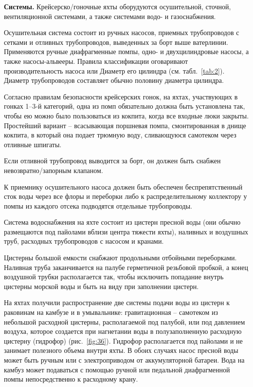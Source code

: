 \documentclass[a4paper, 12pt, twoside, final, book, russian, fittopage, cyremdash]{ncc}
\newcommand{\ris}[1]{\ref{fig:#1}}
\begin{document}
\textbf{Системы.} Крейсерско\-/гоночные яхты оборудуются осушительной, сточной, вентиляционной системами, а также системами водо- и газоснабжения. 

Осушительная система состоит из ручных насосов, приемных трубопроводов с сетками и отливных трубопроводов, выведенных за борт выше ватерлинии. Применяются ручные диафрагменные помпы, одно- и двухцилиндровые насосы, а также насосы-альвееры. Правила классификации оговаривают производительность насоса или Диаметр его цилиндра (см. табл.~\ref{tab:2}). Диаметр трубопроводов составляет обычно половину диаметра цилиндра. 

Согласно правилам безопасности крейсерских гонок, на яхтах, участвующих в гонках 1--3-й категорий, одна из помп обязательно должна быть установлена так, чтобы ею можно было пользоваться из кокпита, когда все входные люки закрыты. Простейший вариант \--- всасывающая поршневая помпа, смонтированная в днище кокпита, в который она подает трюмную воду, сливающуюся самотеком через отливные шпигаты. 

Если отливной трубопровод выводится за борт, он должен быть снабжен невозвратно\-/запорным клапаном.

К приемнику осушительного насоса должен быть обеспечен беспрепятственный сток воды через все флоры и переборки либо к распределительному коллектору у помпы из каждого отсека подводятся отдельные трубопроводы.

Система водоснабжения на яхте состоит из цистерн пресной воды (они обычно размещаются под пайолами вблизи центра тяжести яхты), наливных и воздушных труб, расходных трубопроводов с насосом и кранами.

Цистерны большой емкости снабжают продольными отбойными переборками. Наливная труба заканчивается на палубе герметичной резьбовой пробкой, а конец воздушной трубки располагается так, чтобы исключить попадание внутрь цистерны морской воды и быть на виду при заполнении цистерн.

На яхтах получили распространение две системы подачи воды из цистерн к раковинам на камбузе и в умывальнике: гравитационная \--- самотеком из небольшой расходной цистерны, располагаемой под палубой, или под давлением воздуха, которое создается при нагнетании воды в полузаполненную расходную цистерну (гидрофор) (рис.~\ris{36}). Гидрофор располагается под пайолами и не занимает полезного объема внутри яхты. В обоих случаях насос пресной воды может быть ручным или с электроприводом от аккумуляторной батареи. Вода на камбуз может подаваться с помощью ручной или педальной диафрагменной помпы непосредственно к расходному крану.
\end{document}
